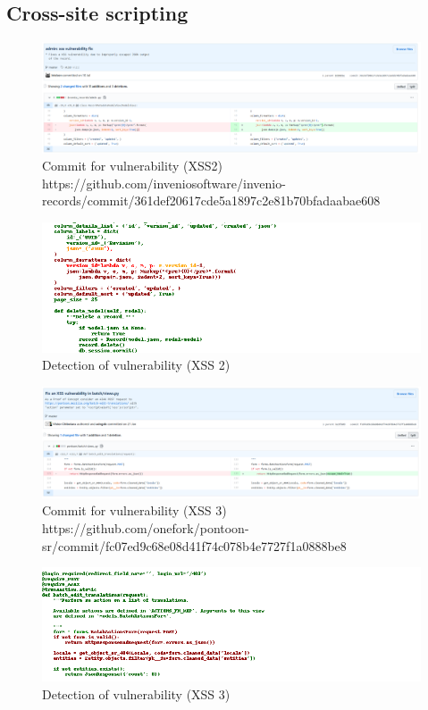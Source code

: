 \documentclass[
a4paper,
pagesize,
pdftex,
12pt,
twoside, %
BCOR=5mm, %
ngerman,
fleqn,
final,
]{scrartcl}
\begin{document}
	\subsection{Cross-site scripting}
	
	
	\begin{figure}[H]
		\centering
		\includegraphics[width=\linewidth]{Images/xssB}
		\caption{Commit for vulnerability (XSS2) \newline \scriptsize{https://github.com/inveniosoftware/invenio-records/commit/361def20617cde5a1897c2e81b70bfadaabae608}}
		\label{fig:xssB}
	\end{figure}
	\begin{figure}[H]
		\centering
		\includegraphics[width=\linewidth]{Images/xssBr}
		\caption{Detection of vulnerability (XSS 2)}
		\label{fig:xssBr}
	\end{figure}
	
	
	\begin{figure}[H]
		\centering
		\includegraphics[width=\linewidth]{Images/xssC}
		\caption{Commit for vulnerability (XSS 3) \newline \scriptsize{https://github.com/onefork/pontoon-sr/commit/fc07ed9c68e08d41f74c078b4e7727f1a0888be8}}
		\label{fig:xssC}
	\end{figure}
	\begin{figure}[H]
		\centering
		\includegraphics[width=\linewidth]{Images/xssCr}
		\caption{Detection of vulnerability (XSS 3)}
		\label{fig:xssCr}
	\end{figure}	
		
\end{document}
